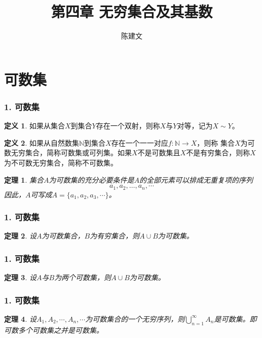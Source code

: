 \documentclass{beamer}
\begin{document}
\begin{CJK*}{UTF8}{gbsn}

\newtheorem{Thm}{定理}[section]
\newtheorem{Cor}{推论}[section]
\newtheorem{Ax}{公理}[section]
\theoremstyle{definition}
\newtheorem{Def}{定义}[section]
\theoremstyle{example}
\newtheorem*{Ex}{例：}
\date{}
\author{陈建文}

\title{第四章 无穷集合及其基数}
\begin{frame}
  \titlepage
\end{frame}  
\section{可数集}
\begin{frame}
  \frametitle{1. 可数集}
  \begin{Def}
    如果从集合$X$到集合$Y$存在一个双射，则称$X$与$Y$\alert{对等}，记为$X \sim Y$。
  \end{Def}\pause
  \begin{Def}
    如果从自然数集$\mathbb{N}$到集合$X$存在一个一一对应$f:\mathbb{N}\to X$，则称
    集合$X$为可数无穷集合，简称\alert{可数集}或\alert{可列集}。如果$X$不是可数集且$X$不是有穷集合，则称$X$为不可数无穷集合，简称\alert{不可数集}。
  \end{Def}\pause
  \begin{Thm}
    集合$A$为可数集的充分必要条件是$A$的全部元素可以排成无重复项的序列
    \[a_1, a_2, \ldots, a_n, \cdots\]
    因此，$A$可写成$A = \{a_1, a_2, a_3, \cdots\}$。
  \end{Thm}
\end{frame}

\begin{frame}
  \frametitle{1. 可数集}
  \begin{Thm}
   设$A$为可数集合，$B$为有穷集合，则$A\cup B$为可数集。
  \end{Thm}
\end{frame}

\begin{frame}
  \frametitle{1. 可数集}
  \begin{Thm}
    设$A$与$B$为两个可数集，则$A\cup B$为可数集。
  \end{Thm}
\end{frame}

\begin{frame}
  \frametitle{1. 可数集}
  \begin{Thm}
    设$A_1, A_2, \cdots, A_n, \cdots$为可数集合的一个无穷序列，则$\bigcup_{n=1}^{\infty}A_n$是可数集。即可数多个可数集之并是可数集。
  \end{Thm}
\end{frame}


\end{CJK*}
\end{document}
